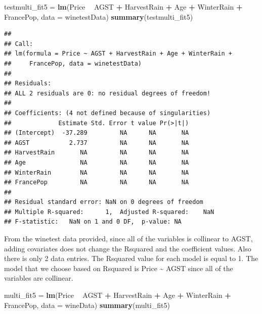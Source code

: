 \documentclass[
]{article}
\newenvironment{Shaded}{\begin{snugshade}}{\end{snugshade}}
\newcommand{\DataTypeTok}[1]{\textcolor[rgb]{0.13,0.29,0.53}{#1}}
\newcommand{\KeywordTok}[1]{\textcolor[rgb]{0.13,0.29,0.53}{\textbf{#1}}}
\newcommand{\NormalTok}[1]{#1}
\newcommand{\OperatorTok}[1]{\textcolor[rgb]{0.81,0.36,0.00}{\textbf{#1}}}
\newcommand{\StringTok}[1]{\textcolor[rgb]{0.31,0.60,0.02}{#1}}
\begin{document}
\begin{Shaded}
\begin{Highlighting}[]
\NormalTok{testmulti_fit5 =}\StringTok{ }\KeywordTok{lm}\NormalTok{(Price }\OperatorTok{~}\StringTok{ }\NormalTok{AGST }\OperatorTok{+}\StringTok{ }\NormalTok{HarvestRain }\OperatorTok{+}\StringTok{ }\NormalTok{Age }\OperatorTok{+}\StringTok{ }\NormalTok{WinterRain }\OperatorTok{+}\StringTok{ }\NormalTok{FrancePop, }\DataTypeTok{data =}\NormalTok{ winetestData)}
\KeywordTok{summary}\NormalTok{(testmulti_fit5)}
\end{Highlighting}
\end{Shaded}

\begin{verbatim}
## 
## Call:
## lm(formula = Price ~ AGST + HarvestRain + Age + WinterRain + 
##     FrancePop, data = winetestData)
## 
## Residuals:
## ALL 2 residuals are 0: no residual degrees of freedom!
## 
## Coefficients: (4 not defined because of singularities)
##             Estimate Std. Error t value Pr(>|t|)
## (Intercept)  -37.289         NA      NA       NA
## AGST           2.737         NA      NA       NA
## HarvestRain       NA         NA      NA       NA
## Age               NA         NA      NA       NA
## WinterRain        NA         NA      NA       NA
## FrancePop         NA         NA      NA       NA
## 
## Residual standard error: NaN on 0 degrees of freedom
## Multiple R-squared:      1,  Adjusted R-squared:    NaN 
## F-statistic:   NaN on 1 and 0 DF,  p-value: NA
\end{verbatim}

From the winetest data provided, since all of the variables is collinear
to AGST, adding covariates does not change the Rsquared and the
coefficient values. Also there is only 2 data entries. The Rsquared
value for each model is equal to 1. The model that we choose based on
Rsquared is Price \textasciitilde{} AGST since all of the variables are
collinear.

\begin{Shaded}
\begin{Highlighting}[]
\NormalTok{multi_fit5 =}\StringTok{ }\KeywordTok{lm}\NormalTok{(Price }\OperatorTok{~}\StringTok{ }\NormalTok{AGST }\OperatorTok{+}\StringTok{ }\NormalTok{HarvestRain }\OperatorTok{+}\StringTok{ }\NormalTok{Age }\OperatorTok{+}\StringTok{ }\NormalTok{WinterRain }\OperatorTok{+}\StringTok{ }\NormalTok{FrancePop, }\DataTypeTok{data =}\NormalTok{ wineData)}
\KeywordTok{summary}\NormalTok{(multi_fit5)}
\end{Highlighting}
\end{Shaded}
\end{document}
